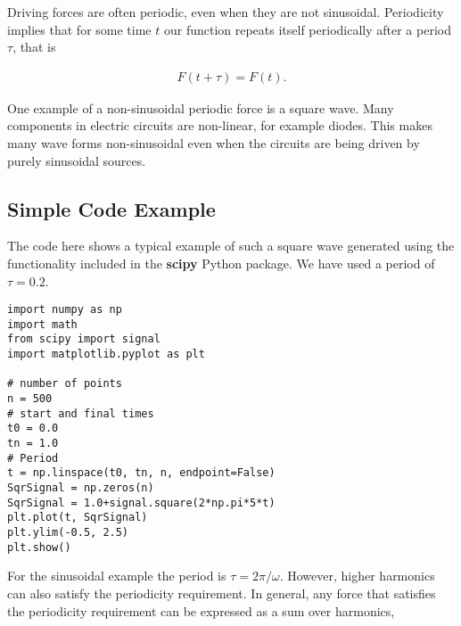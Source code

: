 \documentclass[%
oneside,                 %
final,                   %
10pt]{article}
\begin{document}
Driving forces are often periodic, even when they are not
sinusoidal. Periodicity implies that for some time $t$ our function repeats itself periodically after a period $\tau$, that is

\begin{eqnarray}
F(t+\tau)=F(t). 
\end{eqnarray}

One example of a non-sinusoidal periodic force is a square wave. Many
components in electric circuits are non-linear, for example diodes. This 
makes many wave forms non-sinusoidal even when the circuits are being
driven by purely sinusoidal sources.

\subsection*{Simple Code Example}

The code here shows a typical example of such a square wave generated
using the functionality included in the \textbf{scipy} Python package. We
have used a period of $\tau=0.2$.



















\begin{verbatim}
import numpy as np
import math
from scipy import signal
import matplotlib.pyplot as plt

# number of points                                                                                       
n = 500
# start and final times                                                                                  
t0 = 0.0
tn = 1.0
# Period                                                                                                 
t = np.linspace(t0, tn, n, endpoint=False)
SqrSignal = np.zeros(n)
SqrSignal = 1.0+signal.square(2*np.pi*5*t)
plt.plot(t, SqrSignal)
plt.ylim(-0.5, 2.5)
plt.show()

\end{verbatim}


For the sinusoidal example the
period is $\tau=2\pi/\omega$. However, higher harmonics can also
satisfy the periodicity requirement. In general, any force that
satisfies the periodicity requirement can be expressed as a sum over
harmonics,
\end{document}
